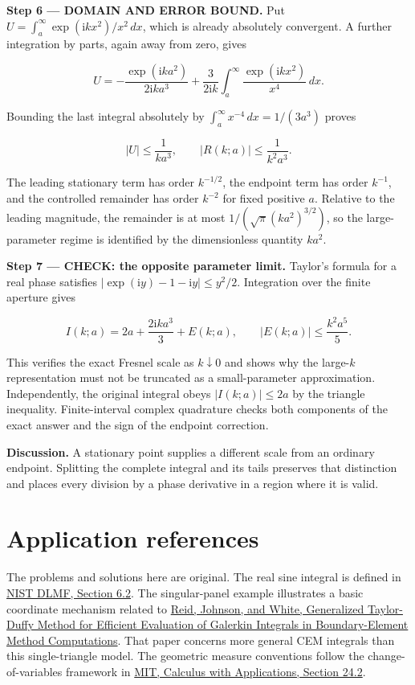 \documentclass[11pt,oneside,openany]{book}
\begin{document}
\begin{DomainStep}
\textbf{Step 6 --- DOMAIN AND ERROR BOUND.} Put \(U=\int_a^\infty\exp(\mathrm{i}kx^2)/x^2\,dx\), which is already absolutely convergent. A further integration by parts, again away from zero, gives

\[
U=-\frac{\exp(\mathrm{i}ka^2)}{2\mathrm{i}ka^3}
+\frac3{2\mathrm{i}k}\int_a^\infty\frac{\exp(\mathrm{i}kx^2)}{x^4}\,dx.
\]

Bounding the last integral absolutely by \(\int_a^\infty x^{-4}\,dx=1/(3a^3)\) proves

\[
|U|\le\frac1{ka^3},\qquad
|R(k;a)|\le\frac1{k^2a^3}.
\]

The leading stationary term has order \(k^{-1/2}\), the endpoint term has order \(k^{-1}\), and the controlled remainder has order \(k^{-2}\) for fixed positive \(a\). Relative to the leading magnitude, the remainder is at most \(1/(\sqrt\pi(ka^2)^{3/2})\), so the large-parameter regime is identified by the dimensionless quantity \(ka^2\).

\end{DomainStep}
\textbf{Step 7 --- CHECK: the opposite parameter limit.} Taylor's formula for a real phase satisfies \(|\exp(\mathrm{i}y)-1-\mathrm{i}y|\le y^2/2\). Integration over the finite aperture gives

\[
I(k;a)=2a+\frac{2\mathrm{i}ka^3}{3}+E(k;a),
\qquad |E(k;a)|\le\frac{k^2a^5}{5}.
\]

This verifies the exact Fresnel scale as \(k\downarrow0\) and shows why the large-\(k\) representation must not be truncated as a small-parameter approximation. Independently, the original integral obeys \(|I(k;a)|\le2a\) by the triangle inequality. Finite-interval complex quadrature checks both components of the exact answer and the sign of the endpoint correction.

\textbf{Discussion.} A stationary point supplies a different scale from an ordinary endpoint. Splitting the complete integral and its tails preserves that distinction and places every division by a phase derivative in a region where it is valid.

\section{Application references}

The problems and solutions here are original. The real sine integral is defined
in \href{https://dlmf.nist.gov/6.2}{NIST DLMF, Section 6.2}.
The singular-panel example illustrates a basic coordinate mechanism related to
\href{https://arxiv.org/abs/1312.1703}{Reid, Johnson, and White, Generalized Taylor-Duffy Method for Efficient Evaluation of Galerkin Integrals in Boundary-Element Method Computations}.
That paper concerns more general CEM integrals than this single-triangle model.
The geometric measure conventions follow the change-of-variables framework in
\href{https://ocw.mit.edu/ans7870/18/18.013a/textbook/chapter24/section02.html}{MIT, Calculus with Applications, Section 24.2}.
\end{document}
